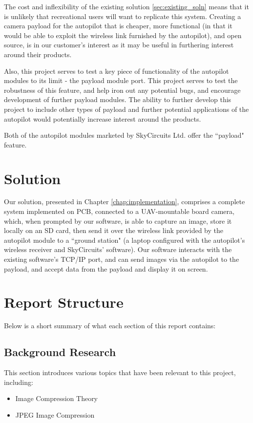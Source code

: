 The cost and inflexibility of the existing solution \ref{sec:existing_soln} means that it is unlikely that recreational users will want to replicate this system. Creating a camera payload for the autopilot that is cheaper, more functional (in that it would be able to exploit the wireless link furnished by the autopilot), and open source, is in our customer's interest as it may be useful in furthering interest around their products.

Also, this project serves to test a key piece of functionality of the autopilot modules to its limit - the payload module port. This project serves to test the robustness of this feature, and help iron out any potential bugs, and encourage development of further payload modules. The ability to further develop this project to include other types of payload and further potential applications of the autopilot would potentially increase interest around the products.

Both of the autopilot modules marketed by SkyCircuits Ltd. offer the ``payload" feature.

\section{Solution}

Our solution, presented in Chapter \ref{chap:implementation}, comprises a complete system implemented on PCB, connected to a UAV-mountable board camera, which, when prompted by our software, is able to capture an image, store it locally on an SD card, then send it over the wireless link provided by the autopilot module to a ``ground station" (a laptop configured with the autopilot's wireless receiver and SkyCircuits' software). Our software interacts with the existing software's TCP/IP port, and can send images via the autopilot to the payload, and accept data from the payload and display it on screen.

\section{Report Structure}

Below is a short summary of what each section of this report contains:

\subsection{Background Research}
This section introduces various topics that have been relevant to this project, including:
\begin{itemize}
\item Image Compression Theory
\item JPEG Image Compression 
\end{itemize}

